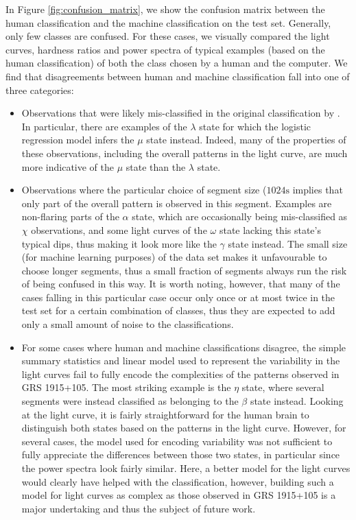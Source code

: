 \documentclass[12pt]{emulateapj}
\begin{document}
In Figure \ref{fig:confusion_matrix}, we show the confusion matrix between the human classification and the machine classification on the 
test set. Generally, only few classes are confused. For these cases, we visually compared the light curves, hardness ratios and power spectra of 
typical examples (based on the human classification) of both the class chosen by a human and the computer. We find that disagreements between 
human and machine classification fall into one of three categories:
\begin{itemize}
\item{Observations that were likely mis-classified in the original classification by \citet{belloni2000}. In particular, there are examples of the 
$\lambda$ state for which the logistic regression model infers the $\mu$ state instead. Indeed, many of the properties of these observations, including 
the overall patterns in the light curve, are much more indicative of the $\mu$ state than the $\lambda$ state.}
\item{Observations where the particular choice of segment size ($1024\mathrm{s}$ implies that only part of the overall pattern is observed in this 
segment. Examples are non-flaring parts of the $\alpha$ state, which are occasionally being mis-classified as $\chi$ observations, and some light 
curves of the $\omega$ state lacking this state's typical dips, thus making it look more like the $\gamma$ state instead. The small size (for machine 
learning purposes) of the data set makes it unfavourable to choose longer segments, thus a small fraction of segments always run the risk of being 
confused in this way. It is worth noting, however, that many of the cases falling in this particular case occur only once or at most twice in the 
test set for a certain combination of classes, thus they are expected to add only a small amount of noise to the classifications.}
\item{For some cases where human and machine classifications disagree, the simple summary statistics and linear model used to represent the variability
 in the light curves fail to fully encode the complexities of the patterns observed in GRS 1915+105. The most striking example is the $\eta$ state, where several 
 segments were instead classified as belonging to the $\beta$ state instead. Looking at the light curve, it is fairly straightforward for the human brain to distinguish 
 both states based on the patterns in the light curve. However, for several cases, the model used for encoding variability was not sufficient to fully appreciate the differences between those two states, in particular since the power spectra look fairly similar. Here, a better model for the light curves would clearly have helped with the classification, however, building such a model for light curves as complex as those observed in GRS 1915+105 is a major undertaking and thus the subject of future work.}
\end{itemize}
\end{document}
